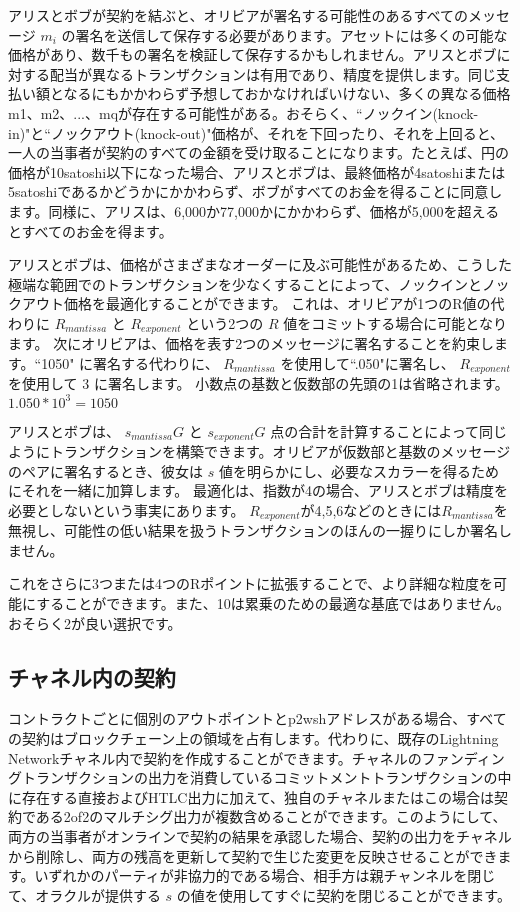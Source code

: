 \documentclass[11pt]{article}
\begin{document}
アリスとボブが契約を結ぶと、オリビアが署名する可能性のあるすべてのメッセージ \(m_i\) の署名を送信して保存する必要があります。アセットには多くの可能な価格があり、数千もの署名を検証して保存するかもしれません。アリスとボブに対する配当が異なるトランザクションは有用であり、精度を提供します。同じ支払い額となるにもかかわらず予想しておかなければいけない、多くの異なる価格m1、m2、...、mqが存在する可能性がある。おそらく、``ノックイン(knock-in)"と``ノックアウト(knock-out)"価格が、それを下回ったり、それを上回ると、一人の当事者が契約のすべての金額を受け取ることになります。たとえば、円の価格が10satoshi以下になった場合、アリスとボブは、最終価格が4satoshiまたは5satoshiであるかどうかにかかわらず、ボブがすべてのお金を得ることに同意します。同様に、アリスは、6,000か77,000かにかかわらず、価格が5,000を超えるとすべてのお金を得ます。

アリスとボブは、価格がさまざまなオーダーに及ぶ可能性があるため、こうした極端な範囲でのトランザクションを少なくすることによって、ノックインとノックアウト価格を最適化することができます。 これは、オリビアが1つのR値の代わりに \(R_{mantissa}\) と \(R_{exponent}\) という2つの \(R\) 値をコミットする場合に可能となります。 次にオリビアは、価格を表す2つのメッセージに署名することを約束します。``1050" に署名する代わりに、 \(R_{mantissa}\) を使用して``.050"に署名し、 \(R_{exponent}\) を使用して \(3\) に署名します。 小数点の基数と仮数部の先頭の1は省略されます。 \(1.050 * 10^3 = 1050\)

アリスとボブは、 \(s_{mantissa}G\) と \(s_{exponent}G\) 点の合計を計算することによって同じようにトランザクションを構築できます。オリビアが仮数部と基数のメッセージのペアに署名するとき、彼女は \(s\) 値を明らかにし、必要なスカラーを得るためにそれを一緒に加算します。 
最適化は、指数が4の場合、アリスとボブは精度を必要としないという事実にあります。 \(R_{exponent}\)が4,5,6などのときには\(R_{mantissa}\)を無視し、可能性の低い結果を扱うトランザクションのほんの一握りにしか署名しません。

これをさらに3つまたは4つのRポイントに拡張することで、より詳細な粒度を可能にすることができます。また、10は累乗のための最適な基底ではありません。 おそらく2が良い選択です。

\subsection*{チャネル内の契約}

コントラクトごとに個別のアウトポイントとp2wshアドレスがある場合、すべての契約はブロックチェーン上の領域を占有します。代わりに、既存のLightning Networkチャネル内で契約を作成することができます。チャネルのファンディングトランザクションの出力を消費しているコミットメントトランザクションの中に存在する直接およびHTLC出力に加えて、独自のチャネルまたはこの場合は契約である2of2のマルチシグ出力が複数含めることができます。このようにして、両方の当事者がオンラインで契約の結果を承認した場合、契約の出力をチャネルから削除し、両方の残高を更新して契約で生じた変更を反映させることができます。いずれかのパーティが非協力的である場合、相手方は親チャンネルを閉じて、オラクルが提供する \(s\) の値を使用してすぐに契約を閉じることができます。
\end{document}
